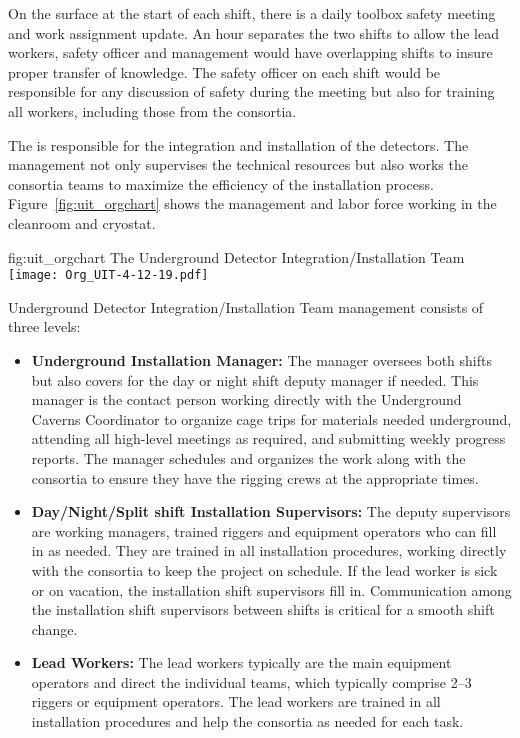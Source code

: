 On the surface at the start of each shift, there is a daily toolbox
safety meeting and work assignment update. An hour separates the two
shifts to allow the lead workers, safety officer and management would
have overlapping shifts to insure proper transfer of knowledge. The
safety officer on each shift would be responsible for any discussion
of safety during the meeting but also for training all workers,
including those from the consortia.

The  is responsible for the integration and installation of
the  detectors.  The management not only supervises the
technical resources but also works the consortia teams to maximize the
efficiency of the installation process. Figure~\ref{fig:uit_orgchart}
shows the management and labor force working in the cleanroom and
cryostat.
\begin{dunefigure}{fig:uit_orgchart}
  {The Underground Detector Integration/Installation Team}
  \texttt{[image: Org\_UIT-4-12-19.pdf]}
\end{dunefigure}
Underground Detector Integration/Installation Team management consists
of three levels:
\begin{itemize}
  \item {\bf Underground Installation Manager:} The  manager oversees
    both shifts but also covers for the day or night shift deputy
    manager if needed. This  manager is the contact person working
    directly with the Underground Caverns Coordinator to organize cage
    trips for materials needed underground, attending all high-level
    meetings as required, and submitting weekly progress reports. The
     manager schedules and organizes the work along with the
    consortia to ensure they have the rigging crews at the appropriate
    times.
  \item {\bf Day/Night/Split shift Installation Supervisors:} The deputy
    supervisors are working managers, trained riggers and equipment
    operators who can fill in as needed. They are trained in all
    installation procedures, working directly with the consortia to
    keep the project on schedule. If the lead worker is sick or on
    vacation, the installation shift supervisors fill
    in. Communication among the installation shift supervisors between
    shifts is critical for a smooth shift change.
  \item {\bf Lead Workers:} The lead workers typically are the main
    equipment operators and direct the individual teams, which
    typically comprise 2--3 riggers or equipment operators. The lead
    workers are trained in all installation procedures and help the
    consortia as needed for each task.
\end{itemize}
        

